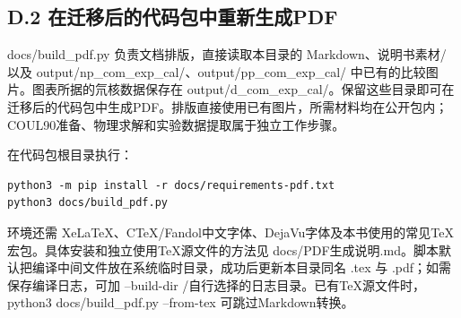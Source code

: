 \documentclass[UTF8,a4paper,zihao=5,fontset=fandol]{ctexart}
\begin{document}
\subsection*{D.2 在迁移后的代码包中重新生成PDF}
{\ttfamily\small docs/\allowbreak{}build\_\allowbreak{}pdf.\allowbreak{}py} 负责文档排版，直接读取本目录的 Markdown、{\ttfamily\small 说明书素材/\allowbreak{}} 以及 {\ttfamily\small output/\allowbreak{}np\_\allowbreak{}com\_\allowbreak{}exp\_\allowbreak{}cal/\allowbreak{}}、{\ttfamily\small output/\allowbreak{}pp\_\allowbreak{}com\_\allowbreak{}exp\_\allowbreak{}cal/\allowbreak{}} 中已有的比较图片。图表所据的氘核数据保存在 {\ttfamily\small output/\allowbreak{}d\_\allowbreak{}com\_\allowbreak{}exp\_\allowbreak{}cal/\allowbreak{}}。保留这些目录即可在迁移后的代码包中生成PDF。排版直接使用已有图片，所需材料均在公开包内；COUL90准备、物理求解和实验数据提取属于独立工作步骤。

在代码包根目录执行：


\begin{Verbatim}[samepage=true,breaklines=true,breakanywhere=true,fontsize=\small,frame=leftline,framesep=3mm,rulecolor=\color{bluegray}]
python3 -m pip install -r docs/requirements-pdf.txt
python3 docs/build_pdf.py
\end{Verbatim}
环境还需 XeLaTeX、CTeX/Fandol中文字体、DejaVu字体及本书使用的常见TeX宏包。具体安装和独立使用TeX源文件的方法见 {\ttfamily\small docs/\allowbreak{}PDF生成说明.\allowbreak{}md}。脚本默认把编译中间文件放在系统临时目录，成功后更新本目录同名 {\ttfamily\small .\allowbreak{}tex} 与 {\ttfamily\small .\allowbreak{}pdf}；如需保存编译日志，可加 {\ttfamily\small --build-dir /\allowbreak{}自行选择的日志目录}。已有TeX源文件时，{\ttfamily\small python3 docs/\allowbreak{}build\_\allowbreak{}pdf.\allowbreak{}py --from-tex} 可跳过Markdown转换。
\end{document}

